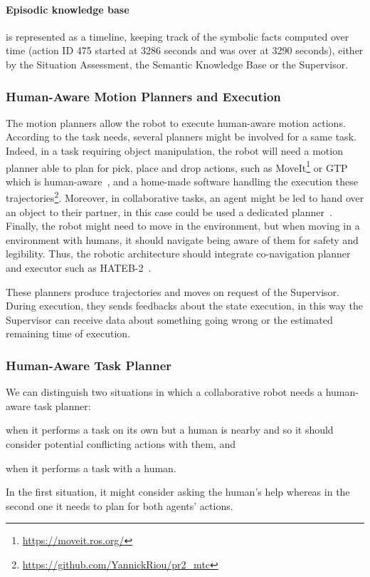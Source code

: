 \documentclass[a4paper,11pt,twoside]{StyleThese}
\begin{document}
\paragraph{Episodic knowledge base} is represented as a timeline, keeping track of the symbolic facts computed over time (\eg action ID 475 started at 3286 seconds and was over at 3290 seconds), either by the Situation Assessment, the Semantic Knowledge Base or the Supervisor. 


\subsubsection{Human-Aware Motion Planners and Execution}\label{chap3:subsubsec:motion}
The motion planners allow the robot to execute human-aware motion actions. According to the task needs, several planners might be involved for a same task. Indeed, in a task requiring object manipulation, the robot will need a motion planner able to plan for pick, place and drop actions, such as MoveIt\footnote{\url{https://moveit.ros.org/}} or GTP which is human-aware~\cite{waldhart_2016_novel}, and a home-made software handling the execution these trajectories\footnote{\url{https://github.com/YannickRiou/pr2_mtc}}. Moreover, in collaborative tasks, an agent might be led to hand over an object to their partner, in this case could be used a dedicated planner~\cite{mainprice_2012_sharing}. Finally, the robot might need to move in the environment, but when moving in a environment with humans, it should navigate being aware of them for safety and legibility. Thus, the robotic architecture should integrate co-navigation planner and executor such as HATEB-2~\cite{singamaneni_2020_hateb}. 

These planners produce trajectories and moves on request of the Supervisor. During execution, they sends feedbacks about the state execution, in this way the Supervisor can receive data about something going wrong or the estimated remaining time of execution. 

\subsubsection{Human-Aware Task Planner}\label{chap3:subsubsec:task_planner}
We can distinguish two situations in which a collaborative robot needs a human-aware task planner: 
\begin{inlineEnumerate}
	\item when it performs a task on its own but a human is nearby and so it should consider potential conflicting actions with them, and
	\item when it performs a task with a human.
\end{inlineEnumerate} 
In the first situation, it might consider asking the human's help whereas in the second one it needs to plan for both agents' actions. 
\end{document}
